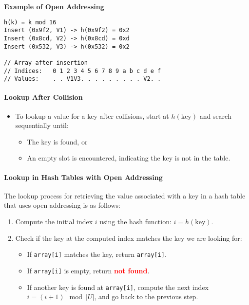 \documentclass[12pt]{article}
\begin{document}
\textbf{Example of Open Addressing}
\begin{lstlisting}
h(k) = k mod 16
Insert (0x9f2, V1) -> h(0x9f2) = 0x2
Insert (0x8cd, V2) -> h(0x8cd) = 0xd
Insert (0x532, V3) -> h(0x532) = 0x2

// Array after insertion
// Indices:   0 1 2 3 4 5 6 7 8 9 a b c d e f
// Values:    . . V1V3. . . . . . . . . V2. .
\end{lstlisting}

\paragraph{Lookup After Collision}
\begin{itemize}
    \item To lookup a value for a key after collisions, start at \( h(\text{key}) \) and search sequentially until:
    \begin{itemize}
        \item The key is found, or
        \item An empty slot is encountered, indicating the key is not in the table.
    \end{itemize}
\end{itemize}


\paragraph{Lookup in Hash Tables with Open Addressing}
The lookup process for retrieving the value associated with a key in a hash table that uses open addressing is as follows:

\begin{enumerate}
    \item Compute the initial index \( i \) using the hash function: \( i = h(\text{key}) \).
    \item Check if the key at the computed index matches the key we are looking for:
    \begin{itemize}
        \item If \texttt{array[i]} matches the key, return \texttt{array[i]}.
        \item If \texttt{array[i]} is empty, return \textcolor{red}{\textbf{not found}}.
        \item If another key is found at \texttt{array[i]}, compute the next index \( i = (i + 1) \mod |U| \), and go back to the previous step.
    \end{itemize}
\end{enumerate}
\end{document}
